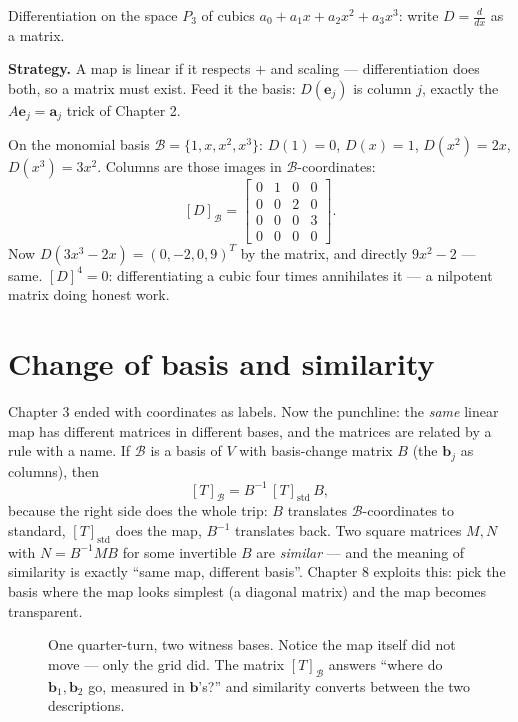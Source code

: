 \begin{example}\label{ex:diffpoly}
Differentiation on the space $P_3$ of cubics $a_0+a_1x+a_2x^2+a_3x^3$:
write $D=\frac{d}{dx}$ as a matrix.
\par\smallskip
\textbf{Strategy.} A map is linear if it respects $+$ and scaling ---
differentiation does both, so a matrix must exist. Feed it the basis:
$D(\mathbf{e}_j)$ is column $j$, exactly the
$A\mathbf{e}_j=\mathbf{a}_j$ trick of Chapter 2.
\begin{solution}
On the monomial basis $\mathcal{B}=\{1,x,x^2,x^3\}$:
$D(1)=0$, $D(x)=1$, $D(x^2)=2x$, $D(x^3)=3x^2$. Columns are those
images in $\mathcal{B}$-coordinates:
\[
  [D]_{\mathcal{B}}=
  \begin{bmatrix}0&1&0&0\\0&0&2&0\\0&0&0&3\\0&0&0&0\end{bmatrix}.
\]
Now $D(3x^3-2x)=(0,-2,0,9)^{T}$ by the matrix, and directly
$9x^2-2$ --- same. $[D]^4=0$: differentiating a cubic four times
annihilates it --- a nilpotent matrix doing honest work. \checkmark
\end{solution}
\end{example}

\section{Change of basis and similarity}\label{sec:changebasis}

Chapter 3 ended with coordinates as labels. Now the punchline: the \emph{same} linear map has different matrices in different bases, and the matrices are related by a rule with a name. If $\mathcal B$ is a basis of $V$ with basis-change matrix $B$ (the $\mathbf b_j$ as columns), then
\[
  [T]_{\mathcal B} = B^{-1}\,[T]_{\text{std}}\,B,
\]
because the right side does the whole trip: $B$ translates $\mathcal B$-coordinates to standard, $[T]_{\text{std}}$ does the map, $B^{-1}$ translates back. Two square matrices $M,N$ with $N=B^{-1}MB$ for some invertible $B$ are \emph{similar} — and the meaning of similarity is exactly ``same map, different basis''. Chapter 8 exploits this: pick the basis where the map looks simplest (a diagonal matrix) and the map becomes transparent.

\begin{figure}[htbp]
\centering

\caption{One quarter-turn, two witness bases. Notice the map itself did not move — only the grid did. The matrix $[T]_{\mathcal B}$ answers ``where do $\mathbf b_1,\mathbf b_2$ go, measured in $\mathbf b$'s?'' and similarity converts between the two descriptions.}
\label{fig:samemap}
\end{figure}

